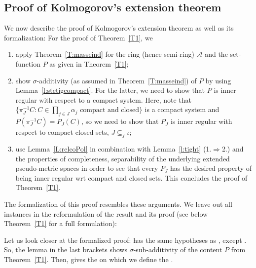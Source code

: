 \documentclass[lean]{AFM}
\begin{document}
\subsection{Proof of Kolmogorov's extension theorem}
We now describe the proof of Kolmogorov's extension theorem as well as
its formalization: For the proof of Theorem~\ref{T1}, we
\begin{enumerate}
  \item apply Theorem~\ref{T:masseind} for the ring (hence semi-ring)
    $\mathcal A$ and the set-function $P$ as given in
    Theorem~\ref{T1};
  \item show $\sigma$-additivity (as assumed in
    Theorem~\ref{T:masseind}) of $P$ by using
    Lemma~\ref{l:stetigcompact}. For the latter, we need to show that
    $P$ is inner regular with respect to a compact system. Here, note
    that $\{\pi_J^{-1}C : C \in \prod_{j\in J} \alpha_j \text{ compact
      and closed}\}$ is a compact system and $P(\pi_J^{-1}C) =
    P_J(C)$, so we need to show that $P_J$ is inner regular with
    respect to compact closed sets, $J\subseteq_f \iota$;
  \item use Lemma~\ref{L:relcoPol} in combination with
    Lemma~\ref{l:tight} (1.$\Rightarrow$2.) and the properties of
    completeness, separability of the underlying extended
    pseudo-metric spaces in order to see that every $P_J$ has the
    desired property of being inner regular wrt compact and closed
    sets. This concludes the proof of Theorem~\ref{T1}.
\end{enumerate}
The formalization of this proof resembles these arguments. We leave
out all instances in the reformulation of the result and its proof
(see below Theorem~\ref{T1} for a full formulation):

\sloppy Let us look closer at the formalized proof:
 has the
same hypotheses as
,
except . So, the lemma in the last brackets shows
$\sigma$-sub-additivity of the content $P$ from
Theorem~\ref{T1}. Then,  gives
the  on which we define the
.
\end{document}
